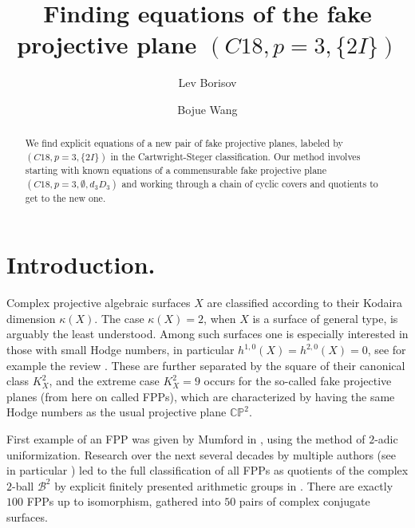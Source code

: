 \documentclass[11pt,reqno]{amsart}
\def\C {{\mathbb C}}
\def\P {{\mathbb P}}
\theoremstyle{definition}
\numberwithin{equation}{section}
\begin{document}
\title{Finding equations of the fake projective plane  $(C18,p=3,\{2I\})$}

\begin{abstract}
We find explicit equations of a new pair of fake projective planes, labeled by  $(C18,p=3,\{2I\})$ in the Cartwright-Steger classification. Our method involves starting with known equations of a commensurable fake projective plane $(C18,p=3,\emptyset,d_3 D_3)$ and working through a chain of cyclic covers and quotients to get to the new one. 
\end{abstract}

\author{Lev Borisov}
\address{Department of Mathematics\\
Rutgers University\\
Piscataway, NJ 08854} 

\author{Bojue Wang}
\address{Department of Mathematics\\
Rutgers University\\
Piscataway, NJ 08854} 

\maketitle

\tableofcontents
\section{Introduction.}\label{intro}
Complex projective algebraic surfaces $X$ are classified according to their Kodaira dimension $\kappa(X)$. The case $\kappa(X)=2$, when $X$ is a surface of general type, is arguably the least understood. Among such surfaces one is especially interested in those with small Hodge numbers, in particular $h^{1,0}(X)=h^{2,0}(X)=0$, see for example the review \cite{BCPsurvey}. These are further separated by the square of their canonical class $K_X^2$, and the extreme case $K_X^2=9$ occurs for the so-called fake projective planes (from here on called FPPs), which are characterized by having the same Hodge numbers as the usual projective plane $\C\P^2$.

\medskip
First example of an FPP was given by Mumford in \cite{Mumford}, using the method of $2$-adic uniformization. Research over the next several decades by multiple authors (see in particular \cite{CS,PY,Ishida,Keum-7,KeumQ,KK,Kl}) led to the full classification of all FPPs as quotients of the complex $2$-ball $\mathcal B^2$ by explicit finitely presented arithmetic groups in \cite{CS}. There are exactly $100$ FPPs up to isomorphism, gathered into $50$ pairs of complex conjugate surfaces. 
\end{document}
